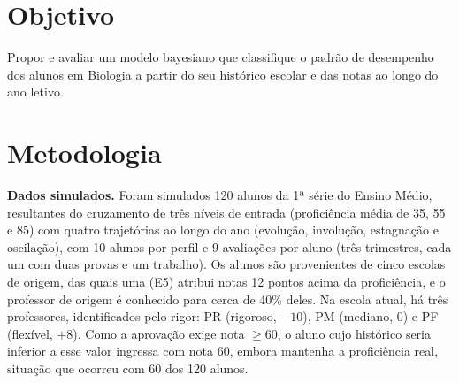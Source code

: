 \documentclass[11pt,a4paper]{article}
\begin{document}
\section{Objetivo}

Propor e avaliar um modelo bayesiano que classifique o padrão de desempenho dos alunos em
Biologia a partir do seu histórico escolar e das notas ao longo do ano letivo.

\section{Metodologia}

\textbf{Dados simulados.} Foram simulados 120 alunos da 1ª série do Ensino Médio, resultantes
do cruzamento de três níveis de entrada (proficiência média de 35, 55 e 85) com quatro
trajetórias ao longo do ano (evolução, involução, estagnação e oscilação), com 10 alunos por
perfil e 9 avaliações por aluno (três trimestres, cada um com duas provas e um trabalho). Os
alunos são provenientes de cinco escolas de origem, das quais uma (E5) atribui notas 12 pontos
acima da proficiência, e o professor de origem é conhecido para cerca de 40\% deles. Na escola
atual, há três professores, identificados pelo rigor: PR (rigoroso, $-10$), PM (mediano, 0) e
PF (flexível, $+8$). Como a aprovação exige nota $\ge 60$, o aluno cujo histórico seria inferior
a esse valor ingressa com nota 60, embora mantenha a proficiência real, situação que ocorreu
com 60 dos 120 alunos.
\end{document}
